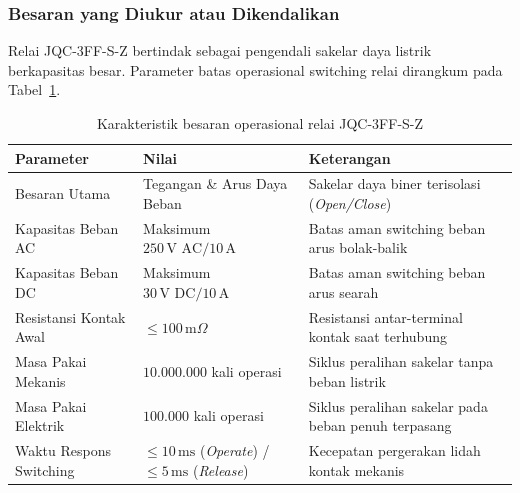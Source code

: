 \subsubsection{Besaran yang Diukur atau Dikendalikan}
Relai JQC-3FF-S-Z bertindak sebagai pengendali sakelar daya listrik berkapasitas besar. Parameter batas operasional switching relai dirangkum pada Tabel~\ref{tab:jqc3ff_karakteristik_besaran}.

\begin{table}[H]
	\centering
	\caption{Karakteristik besaran operasional relai JQC-3FF-S-Z}
	\label{tab:jqc3ff_karakteristik_besaran}
	\small
	\begin{tabularx}{\textwidth}{@{} p{3.8cm} >{\hsize=0.7\hsize}X >{\hsize=1.3\hsize}X @{}}
		\toprule
		Parameter               & Nilai                                                                          & Keterangan                                          \\
		\midrule
		Besaran Utama           & Tegangan \& Arus Daya Beban                                                    & Sakelar daya biner terisolasi (\textit{Open/Close}) \\
		Kapasitas Beban AC      & Maksimum $250\,\text{V AC} / 10\,\text{A}$                                     & Batas aman switching beban arus bolak-balik         \\
		Kapasitas Beban DC      & Maksimum $30\,\text{V DC} / 10\,\text{A}$                                      & Batas aman switching beban arus searah              \\
		Resistansi Kontak Awal  & $\le 100\,\text{m}\Omega$                                                      & Resistansi antar-terminal kontak saat terhubung     \\
		Masa Pakai Mekanis      & $10.000.000$ kali operasi                                                      & Siklus peralihan sakelar tanpa beban listrik        \\
		Masa Pakai Elektrik     & $100.000$ kali operasi                                                         & Siklus peralihan sakelar pada beban penuh terpasang \\
		Waktu Respons Switching & $\le 10\,\text{ms}$ (\textit{Operate}) / $\le 5\,\text{ms}$ (\textit{Release}) & Kecepatan pergerakan lidah kontak mekanis           \\
		\bottomrule
	\end{tabularx}
\end{table}

